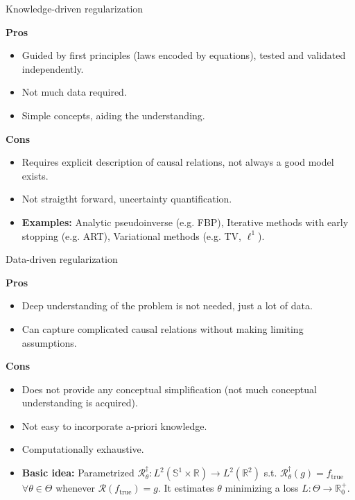 \begin{frame}{Knowledge-driven regularization}
\begin{block}{\textbf{Pros \Smiley{}}}
\begin{itemize}
\item Guided by first principles (laws encoded by equations), tested and validated independently.
\item Not much data required.
\item Simple concepts, aiding the understanding.
\end{itemize}
\end{block}
\pause
\begin{block}{\textbf{Cons \Frowny{}}}
\begin{itemize}
\item Requires explicit description of causal relations, not always a good model exists.
\item Not straigtht forward, uncertainty quantification.
\end{itemize}
\end{block}
\pause
\begin{itemize}
\item \textbf{Examples:} Analytic pseudoinverse (e.g. FBP), Iterative methods with early stopping (e.g. ART), Variational methods (e.g. TV, $\ell^1$). 
\end{itemize}
\end{frame}

\begin{frame}{Data-driven regularization}
\begin{block}{\textbf{Pros \Smiley{}}}
\begin{itemize}
\item Deep understanding of the problem is not needed, just a lot of data.
\item Can capture complicated causal relations without making limiting assumptions.
\end{itemize}
\end{block}

\begin{block}{\textbf{Cons \Frowny{}}}
\begin{itemize}
\item Does not provide any conceptual simplification (not much conceptual understanding is acquired).
\item Not easy to incorporate a-priori knowledge. 
\item Computationally exhaustive.
\end{itemize}
\end{block}

\begin{itemize}
\item \textbf{Basic idea:} Parametrized $\mathcal{R}^{\dagger}_{\theta}: L^2(\mathbb{S}^1\times\mathbb{R})\longrightarrow L^2(\mathbb{R}^2)$ s.t. $\mathcal{R}^{\dagger}_{\theta}(g)=f_{\text{true}}$ $\forall \theta\in\Theta$ whenever $\mathcal{R}(f_{\text{true}})=g$. It estimates $\theta$ minimizing a loss $L:\Theta\longrightarrow \mathbb{R}^+_{0}$.
\end{itemize}
\end{frame}


